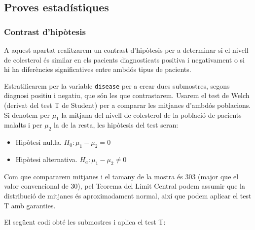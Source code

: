 \documentclass[12,]{article}
\newenvironment{Shaded}{\begin{snugshade}}{\end{snugshade}}
\newcommand{\DecValTok}[1]{\textcolor[rgb]{0.00,0.00,0.81}{#1}}
\newcommand{\KeywordTok}[1]{\textcolor[rgb]{0.13,0.29,0.53}{\textbf{#1}}}
\newcommand{\NormalTok}[1]{#1}
\newcommand{\OperatorTok}[1]{\textcolor[rgb]{0.81,0.36,0.00}{\textbf{#1}}}
\newcommand{\StringTok}[1]{\textcolor[rgb]{0.31,0.60,0.02}{#1}}
\providecommand{\tightlist}{%
  \setlength{\itemsep}{0pt}\setlength{\parskip}{0pt}}
\begin{document}
\hypertarget{proves-estadistiques}{%
\subsection{Proves estadístiques}\label{proves-estadistiques}}

\hypertarget{contrast-dhipotesis}{%
\subsubsection{Contrast d'hipòtesis}\label{contrast-dhipotesis}}

A aquest apartat realitzarem un contrast d'hipòtesis per a determinar si
el nivell de colesterol és similar en els pacients diagnosticats
positiva i negativament o si hi ha diferències significatives entre
ambdós tipus de pacients.

Estratificarem per la variable \texttt{disease} per a crear dues
submostres, segons diagnosi positiu i negatiu, que són les que
contrastarem. Usarem el test de Welch (derivat del test T de Student)
per a comparar les mitjanes d'ambdós poblacions. Si denotem per
\(\mu_{1}\) la mitjana del nivell de colesterol de la població de
pacients malalts i per \(\mu_{2}\) la de la resta, les hipòtesis del
test seran:

\begin{itemize}
\tightlist
\item
  Hipòtesi nul.la. \(H_{0}: \mu_{1}-\mu_{2}=0\)
\item
  Hipòtesi alternativa. \(H_{a}: \mu_{1}-\mu_{2} \ne 0\)
\end{itemize}

Com que compararem mitjanes i el tamany de la mostra és 303 (major que
el valor convencional de 30), pel Teorema del Límit Central podem
assumir que la distribució de mitjanes és aproximadament normal, així
que podem aplicar el test T amb garanties.

El següent codi obté les submostres i aplica el test T:

\begin{Shaded}
\end{Shaded}
\end{document}
